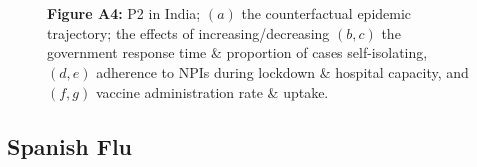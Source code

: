 \documentclass[paper=a4,fontsize=11pt]{article}
\begin{document}
\begin{figure}[!h]
  \\
  \hspace{1.76cm}
  \\
  \caption*{\textbf{Figure A4:} P2 in India; $(a)$ the counterfactual epidemic trajectory; the effects of increasing/decreasing $(b,c)$ the government response time \& proportion of cases self-isolating, $(d,e)$ adherence to NPIs during lockdown \& hospital capacity, and $(f,g)$ vaccine administration rate \& uptake.}
\end{figure}


\subsection{Spanish Flu}
\end{document}
